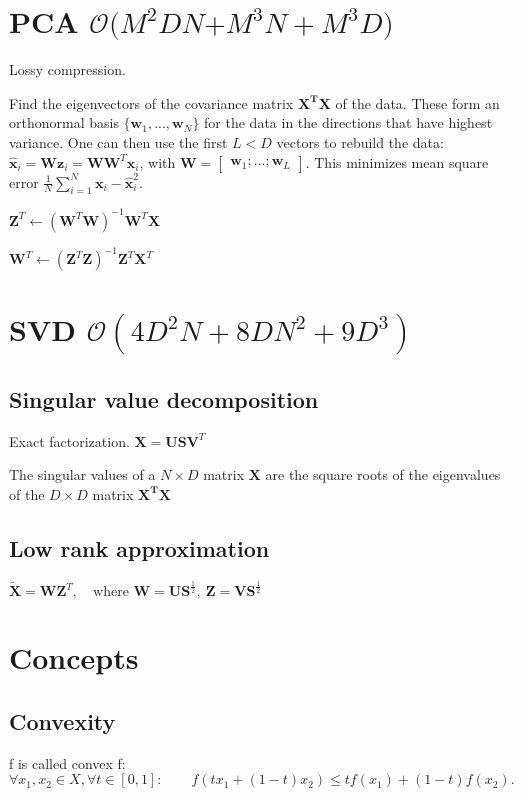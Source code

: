 \documentclass[10pt,a4paper,landscape]{article}
\renewcommand{\bf}[1]{\ensuremath{\mathbf{#1}}}
\begin{document}
\begin{multicols*}{4}
\section{PCA \small $\mathcal{O}(M^2DN$\tiny$+M^3N+M^3D$\small$)$}
Lossy compression.

Find the eigenvectors of the covariance matrix $\bf{X^T X}$ of the data. These form an orthonormal basis $\{ \bf{w}_1, ..., \bf{w}_N\}$ for the data in the directions that have highest variance.
One can then use the first $L < D$ vectors to rebuild the data: $\bf{\hat{x}}_i = \bf{W} \bf{z}_i = \bf{W} \bf{W}^T \bf{x}_i$, with $\bf{W} = \begin{bmatrix} \bf{w}_1 ; ... ; \bf{w}_L \end{bmatrix}$.
This minimizes mean square error $\frac{1}{N} \sum_{i=1}^N \bf{x}_i - \bf{\hat{x}}_i^2$.


$\bf{Z}^T \leftarrow (\bf{W}^T\bf{W})^{-1}\bf{W}^T\bf{X}$


$\bf{W}^T \leftarrow (\bf{Z}^T\bf{Z})^{-1}\bf{Z}^T\bf{X}^T$

\section{SVD \small$\mathcal{O}(4D^2N+8DN^2+9D^3)$}
\subsection{Singular value decomposition}
Exact factorization.
$\bf{X} = \bf{USV}^T$

The singular values of a $N \times D$ matrix $\bf{X}$ are the square roots of the eigenvalues of the $D \times D$ matrix $\bf{X^T X}$

\subsection{Low rank approximation}
$\tilde{\bf{X}} = \bf{WZ}^T, \quad \text{where }\bf{W} = \bf{US}^{\frac{1}{2}},\: \bf{Z}=\bf{VS}^{\frac{1}{2}}$
\section{Concepts}

\subsection{Convexity}
f is called convex f: $\forall x_1, x_2 \in X, \forall t \in [0, 1]: \qquad f(tx_1+(1-t)x_2)\leq t f(x_1)+(1-t)f(x_2).$


\end{multicols*}
\end{document}
